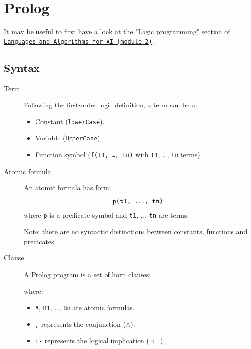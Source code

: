 \chapter{Prolog}


It may be useful to first have a look at the "Logic programming" section of 
\href{https://github.com/NotXia/unibo-ai-notes/tree/pdfs/languages-and-algorithms-for-ai/module2}{\texttt{Languages and Algorithms for AI (module 2)}}.


\section{Syntax}

\begin{description}
    \item[Term] 
        Following the first-order logic definition, a term can be a:
        \begin{itemize}
            \item Constant (\texttt{lowerCase}).
            \item Variable (\texttt{UpperCase}).
            \item Function symbol (\texttt{f(t1, \dots, tn)} with \texttt{t1}, \dots, \texttt{tn} terms).
        \end{itemize}

    \item[Atomic formula] 
        An atomic formula has form:
        \[ \texttt{p(t1, \dots, tn)} \]
        where \texttt{p} is a predicate symbol and \texttt{t1}, \dots, \texttt{tn} are terms.

        Note: there are no syntactic distinctions between constants, functions and predicates.

    \item[Clause] 
        A Prolog program is a set of horn clauses:
        where:
        \begin{itemize}
            \item \texttt{A}, \texttt{B1}, \dots, \texttt{Bn} are atomic formulas.
            \item \texttt{,} represents the conjunction ($\land$).
            \item \texttt{:-} represents the logical implication ($\Leftarrow$).
        \end{itemize}


\end{description}

